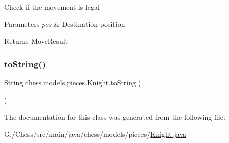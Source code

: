 Check if the movement is legal


\begin{DoxyParams}{Parameters}
{\em pos} & Destination position \\
\hline
\end{DoxyParams}
\begin{DoxyReturn}{Returns}
Move\+Result 
\end{DoxyReturn}
\mbox{\label{classchess_1_1models_1_1pieces_1_1_knight_a18c83fa9040a0035d86c3354f3ada4ea}} 
\subsubsection{\texorpdfstring{to\+String()}{toString()}}
{\footnotesize\ttfamily String chess.\+models.\+pieces.\+Knight.\+to\+String (\begin{DoxyParamCaption}{ }\end{DoxyParamCaption})}



The documentation for this class was generated from the following file\+:\begin{DoxyCompactItemize}
\item 
G\+:/\+Chess/src/main/java/chess/models/pieces/\mbox{\hyperlink{_knight_8java}{Knight.\+java}}\end{DoxyCompactItemize}
